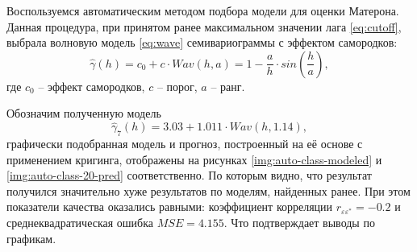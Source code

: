 Воспользуемся автоматическим методом подбора модели для оценки Матерона. Данная процедура, при принятом ранее максимальном значении лага \eqref{eq:cutoff}, выбрала волновую модель \eqref{eq:wave} семивариограммы с эффектом самородков:
\begin{equation}
\label{eq:wave}
	\widehat{\gamma}(h) = c_0 + c \cdot Wav(h, a) = 1 - \frac{a}{h} \cdot sin(\frac{h}{a}),
\end{equation}
где $ c_0 $ -- эффект самородков, $ c $ -- порог, $ a $ -- ранг.

Обозначим полученную модель
\begin{equation}
\label{eq:gamma7}
	\widehat{\gamma}_7(h) = 3.03 + 1.011 \cdot Wav(h, 1.14),
\end{equation}
графически подобранная модель и прогноз, построенный на её основе с применением кригинга, отображены на рисунках \ref{img:auto-class-modeled} и \ref{img:auto-class-20-pred} соответственно. По которым видно, что результат получился значительно хуже результатов по моделям, найденных ранее. При этом показатели качества оказались равными: коэффициент корреляции $ r_{\varepsilon\varepsilon^{*}} = -0.2 $ и среднеквадратическая ошибка $ MSE = 4.155 $. Что подтверждает выводы по графикам.

